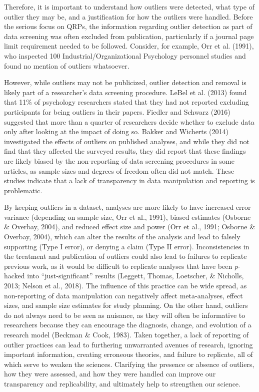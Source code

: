 \documentclass[english,,man,mask]{apa6}
\theoremstyle{definition}
\theoremstyle{definition}
\theoremstyle{definition}
\theoremstyle{remark}
\begin{document}
Therefore, it is important to understand how outliers were detected,
what type of outlier they may be, and a justification for how the
outliers were handled. Before the serious focus on QRPs, the information
regarding outlier detection as part of data screening was often excluded
from publication, particularly if a journal page limit requirement
needed to be followed. Consider, for example, Orr et al. (1991), who
inspected 100 Industrial/Organizational Psychology personnel studies and
found no mention of outliers whatsoever.

However, while outliers may not be publicized, outlier detection and
removal is likely part of a researcher's data screening procedure. LeBel
et al. (2013) found that 11\% of psychology researchers stated that they
had not reported excluding participants for being outliers in their
papers. Fiedler and Schwarz (2016) suggested that more than a quarter of
researchers decide whether to exclude data only after looking at the
impact of doing so. Bakker and Wicherts (2014) investigated the effects
of outliers on published analyses, and while they did not find that they
affected the surveyed results, they did report that these findings are
likely biased by the non-reporting of data screening procedures in some
articles, as sample sizes and degrees of freedom often did not match.
These studies indicate that a lack of transparency in data manipulation
and reporting is problematic.

By keeping outliers in a dataset, analyses are more likely to have
increased error variance (depending on sample size, Orr et al., 1991),
biased estimates (Osborne \& Overbay, 2004), and reduced effect size and
power (Orr et al., 1991; Osborne \& Overbay, 2004), which can alter the
results of the analysis and lead to falsely supporting (Type I error),
or denying a claim (Type II error). Inconsistencies in the treatment and
publication of outliers could also lead to failures to replicate
previous work, as it would be difficult to replicate analyses that have
been \emph{p}-hacked into \enquote{just-significant} results (Leggett,
Thomas, Loetscher, \& Nicholls, 2013; Nelson et al., 2018). The
influence of this practice can be wide spread, as non-reporting of data
manipulation can negatively affect meta-analyses, effect sizes, and
sample size estimates for study planning. On the other hand, outliers do
not always need to be seen as nuisance, as they will often be
informative to researchers because they can encourage the diagnosis,
change, and evolution of a research model (Beckman \& Cook, 1983). Taken
together, a lack of reporting of outlier practices can lead to
furthering unwarranted avenues of research, ignoring important
information, creating erroneous theories, and failure to replicate, all
of which serve to weaken the sciences. Clarifying the presence or
absence of outliers, how they were assessed, and how they were handled
can improve our transparency and replicability, and ultimately help to
strengthen our science.
\end{document}
